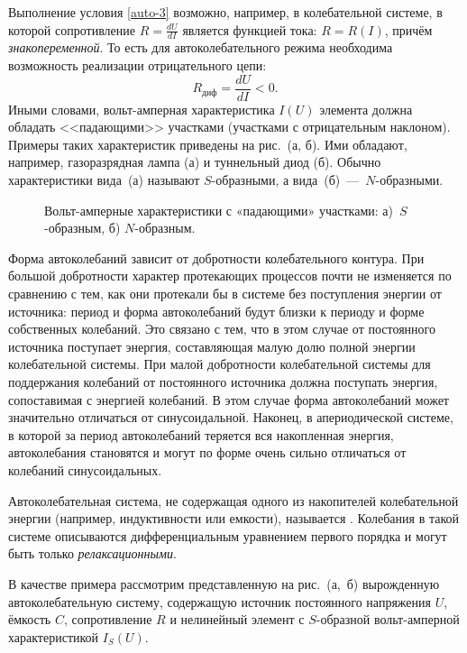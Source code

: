 Выполнение условия \eqref{auto-3} возможно, например, в 
колебательной системе, в которой сопротивление $R=\frac{dU}{dI}$ является 
функцией тока: $R=R(I)$, причём \emph{знакопеременной}. То есть для 
автоколебательного режима необходима возможность реализации
отрицательного  цепи:
\[
R_{диф} = \frac{dU}{dI} < 0.
\]
Иными словами, вольт-амперная характеристика $I(U)$ элемента должна
обладать <<падающими>> участками (участками с отрицательным наклоном). 
Примеры таких характеристик приведены на
рис.~(а, б). Ими обладают, например, газоразрядная лампа 
(а) и туннельный диод (б). Обычно характеристики вида~(а) называют $S$-образными, 
а вида~(б)~---~$N$-образными.
\begin{figure}
	\centering
	\caption{Вольт-амперные характеристики с «падающими» участками: а)~$S$-образным, б) $N$-образным.}
\end{figure}

Форма автоколебаний зависит от добротности колебательного контура. При большой
добротности характер протекающих процессов почти не изменяется по сравнению с
тем, как они протекали бы в системе без поступления
энергии от источника: период и форма автоколебаний будут близки к периоду и
форме собственных колебаний. Это связано с тем, что в этом случае от постоянного
источника поступает энергия, составляющая малую
долю полной энергии колебательной системы. При малой добротности колебательной системы 
для поддержания колебаний от постоянного
источника должна поступать энергия, сопоставимая с энергией колебаний. В этом
случае форма автоколебаний может значительно отличаться от синусоидальной.
Наконец, в апериодической системе, в которой за период автоколебаний теряется вся
накопленная энергия, автоколебания становятся  и
могут по форме очень сильно отличаться от колебаний синусоидальных.

Автоколебательная система, не содержащая одного из накопителей колебательной
энергии (например, индуктивности или емкости), называется . Колебания в такой системе
описываются дифференциальным уравнением первого порядка и могут быть
только \emph{релаксационными}.

В качестве примера рассмотрим представленную на рис.~(а,~б) 
вырожденную автоколебательную систему, содержащую источник
постоянного напряжения $U$, ёмкость $C$, сопротивление $R$ и нелинейный элемент
с $S$-образной вольт-амперной характеристикой $I_S(U)$. 

